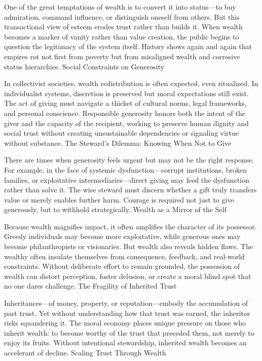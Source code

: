 \documentclass[11pt,oneside]{book}
\begin{document}
One of the great temptations of wealth is to convert it into status—to buy admiration, command influence, or distinguish oneself from others. But this transactional view of esteem erodes trust rather than builds it. When wealth becomes a marker of vanity rather than value creation, the public begins to question the legitimacy of the system itself. History shows again and again that empires rot not first from poverty but from misaligned wealth and corrosive status hierarchies.
Social Constraints on Generosity

In collectivist societies, wealth redistribution is often expected, even ritualized. In individualist systems, discretion is preserved but moral expectations still exist. The act of giving must navigate a thicket of cultural norms, legal frameworks, and personal conscience. Responsible generosity honors both the intent of the giver and the capacity of the recipient, working to preserve human dignity and social trust without creating unsustainable dependencies or signaling virtue without substance.
The Steward’s Dilemma: Knowing When Not to Give

There are times when generosity feels urgent but may not be the right response. For example, in the face of systemic dysfunction—corrupt institutions, broken families, or exploitative intermediaries—direct giving may feed the dysfunction rather than solve it. The wise steward must discern whether a gift truly transfers value or merely enables further harm. Courage is required not just to give generously, but to withhold strategically.
Wealth as a Mirror of the Self

Because wealth magnifies impact, it often amplifies the character of its possessor. Greedy individuals may become more exploitative, while generous ones may become philanthropists or visionaries. But wealth also reveals hidden flaws. The wealthy often insulate themselves from consequence, feedback, and real-world constraints. Without deliberate effort to remain grounded, the possession of wealth can distort perception, foster delusion, or create a moral blind spot that no one dares challenge.
The Fragility of Inherited Trust

Inheritances—of money, property, or reputation—embody the accumulation of past trust. Yet without understanding how that trust was earned, the inheritor risks squandering it. The moral economy places unique pressure on those who inherit wealth: to become worthy of the trust that preceded them, not merely to enjoy its fruits. Without intentional stewardship, inherited wealth becomes an accelerant of decline.
Scaling Trust Through Wealth
\end{document}
